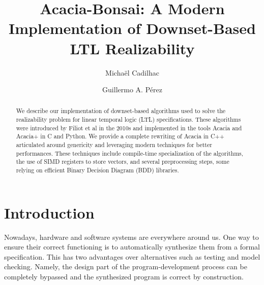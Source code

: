 \documentclass[sigconf,screen,nonacm]{acmart}
\begin{document}
\title{Acacia-Bonsai: A Modern Implementation of Downset-Based LTL Realizability}

\author{Michaël Cadilhac}

\author{Guillermo A. Pérez}

\begin{abstract}
  We describe our implementation of downset-based algorithms used to solve the
  realizability problem for linear temporal logic (LTL) specifications.  These
  algorithms were introduced by Filiot et al in the 2010s and implemented in the
  tools Acacia and Acacia+ in C and Python.  We provide a complete rewriting of
  Acacia in C++ articulated around genericity and leveraging modern techniques
  for better performances.  These techniques include compile-time specialization
  of the algorithms, the use of SIMD registers to store vectors, and several
  preprocessing steps, some relying on efficient Binary Decision Diagram (BDD)
  libraries.
\end{abstract}


\maketitle

\section{Introduction}

Nowadays, hardware and software systems are everywhere around us. One way to
ensure their correct functioning is to automatically synthesize them from a
formal specification.  This has two advantages over alternatives such as
testing and model checking.  Namely, the design part of the
program-development process can be completely bypassed and the synthesized
program is correct by construction.
\end{document}
